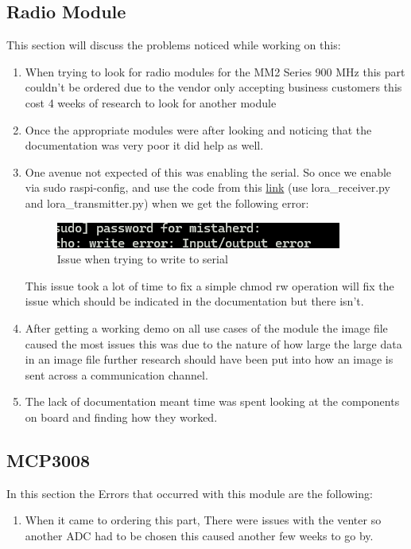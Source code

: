 \subsection{Radio Module}
This section will discuss the problems noticed while working on this:
\begin{enumerate}
    \item When trying to look for radio modules for the MM2 Series 900 MHz this part couldn't be ordered due to the vendor only accepting business customers this cost 4 weeks of research to look for another module
    \item Once the appropriate modules were after looking and noticing that the documentation was very poor it did help as well.
    \item One avenue not expected of this was enabling the serial. So once we enable via sudo raspi-config, and use the code from this \href{https://github.com/sbcshop/Lora-HAT-for-Raspberry-Pi}{link} (use lora\_receiver.py and lora\_transmitter.py) when we get the following error:

    \begin{figure}[h!]
        \centering
        \includegraphics[width=0.5\linewidth]{Images/write_issue_linux_ser.png}
        \caption{Issue when trying to write to serial }
        \label{Issue when trying to write to serial}
    \end{figure}
    This issue took a lot of time to fix a simple chmod rw operation will fix the issue which should be indicated in the documentation but there isn't.
    \item After getting a working demo on all use cases of the module the image file caused the most issues this was due to the nature of how large the large data in an image file further research should have been put into how an image is sent across a communication channel.
    \item The lack of documentation meant time was spent looking at the components on board and finding how they worked. 
\end{enumerate}
\subsection{MCP3008}
In this section the Errors that occurred with this module are the following:
\begin{enumerate}
    \item When it came to ordering this part, There were issues with the venter so another ADC had to be chosen this caused another few weeks to go by.
\end{enumerate}
